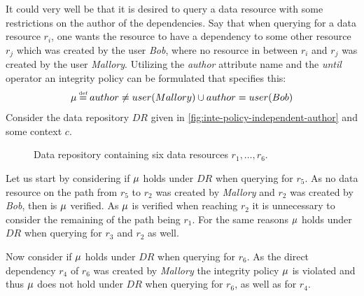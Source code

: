 \begin{example}
It could very well be that it is desired to query a data resource with some restrictions on the author of the dependencies. Say that when querying for a data resource $r_i$, one wants the resource to have a dependency to some other resource $r_j$ which was created by the user \emph{Bob}, where no resource in between $r_i$ and $r_j$ was created by the user \emph{Mallory}. Utilizing the \emph{author} attribute name and the \emph{until} operator an integrity policy can be formulated that specifies this:
\begin{align*}
    \inte \eqdef author \neq user(Mallory) \U author = user(Bob)
\end{align*}
Consider the data repository $DR$ given in \autoref{fig:inte-policy-independent-author} and some context $c$.
\begin{figure}[!ht]
    \begin{center}
        
        \caption{Data repository containing six data resources $r_1, \ldots, r_6$.}
        \label{fig:inte-policy-independent-author}
    \end{center}
\end{figure}
Let us start by considering if $\mu$ holds under $DR$ when querying for $r_5$. As no data resource on the path from $r_5$ to $r_2$ was created by \emph{Mallory} and $r_2$ was created by \emph{Bob}, then is $\mu$ verified. As $\mu$ is verified when reaching $r_2$ it is unnecessary to consider the remaining of the path being $r_1$. For the same reasons $\mu$ holds under $DR$ when querying for $r_3$ and $r_2$ as well.

Now consider if $\mu$ holds under $DR$ when querying for $r_6$. As the direct dependency $r_4$ of $r_6$ was created by \emph{Mallory} the integrity policy $\mu$ is violated and thus $\mu$ does not hold under $DR$ when querying for $r_6$, as well as for $r_4$.
\end{example}

